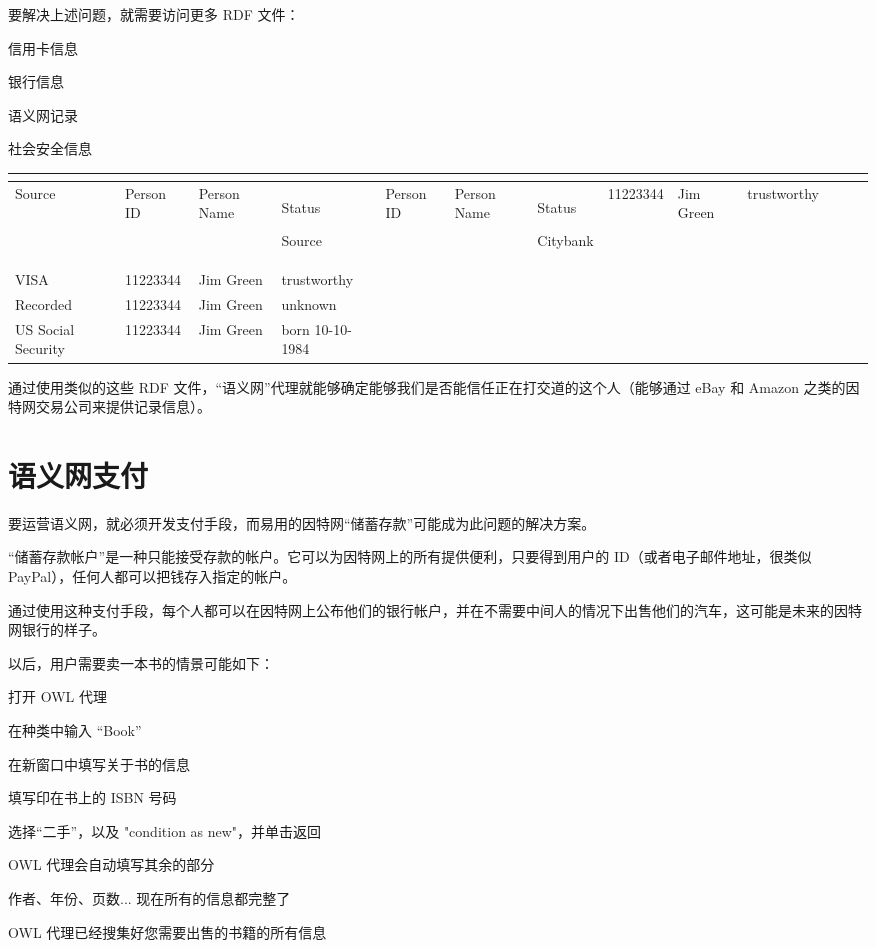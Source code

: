要解决上述问题，就需要访问更多 RDF 文件：

\begin{compactitem}
\item 信用卡信息
\item 银行信息
\item 语义网记录
\item 社会安全信息
\end{compactitem}


\begin{longtable}{|p{90pt}|p{90pt}|p{90pt}|p{90pt}|}
\tabularnewline\hline
Source	&Person ID	&Person Name	&Status
\endhead

\hline
Source	&Person ID	&Person Name	&Status
\endfirsthead

\endfoot

\endlastfoot
\hline
Citybank			&11223344	&Jim Green	&trustworthy\\
\hline
VISA				&11223344	&Jim Green	&trustworthy\\
\hline
Recorded			&11223344	&Jim Green	&unknown\\
\hline
US Social Security	&11223344	&Jim Green	&born 10-10-1984\\
\hline

\end{longtable}

通过使用类似的这些 RDF 文件，“语义网”代理就能够确定能够我们是否能信任正在打交道的这个人（能够通过 eBay 和 Amazon 之类的因特网交易公司来提供记录信息）。

\section{语义网支付}



要运营语义网，就必须开发支付手段，而易用的因特网“储蓄存款”可能成为此问题的解决方案。

“储蓄存款帐户”是一种只能接受存款的帐户。它可以为因特网上的所有提供便利，只要得到用户的 ID（或者电子邮件地址，很类似 PayPal），任何人都可以把钱存入指定的帐户。

通过使用这种支付手段，每个人都可以在因特网上公布他们的银行帐户，并在不需要中间人的情况下出售他们的汽车，这可能是未来的因特网银行的样子。

以后，用户需要卖一本书的情景可能如下：

\begin{compactitem}
\item 打开 OWL 代理
\item 在种类中输入 “Book”
\item 在新窗口中填写关于书的信息
\item 填写印在书上的 ISBN 号码
\item 选择“二手”，以及 "condition as new"，并单击返回
\item OWL 代理会自动填写其余的部分
\item 作者、年份、页数... 现在所有的信息都完整了
\item OWL 代理已经搜集好您需要出售的书籍的所有信息
\end{compactitem}

